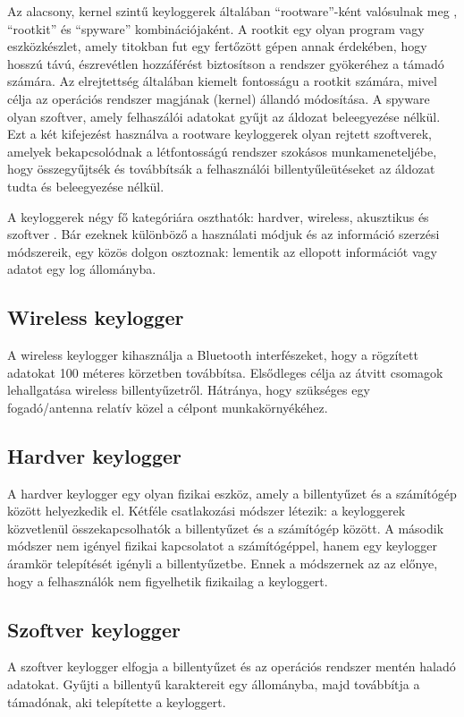 \documentclass[12pt,a4paper,oneside]{report}
\begin{document}
Az alacsony, kernel szintű keyloggerek általában ``rootware''-ként valósulnak meg \cite{butler2006r2}, ``rootkit'' és ``spyware'' kombinációjaként. A rootkit egy olyan program vagy eszközkészlet, amely titokban fut egy fertőzött gépen annak érdekében, hogy hosszú távú, észrevétlen hozzáférést biztosítson a rendszer gyökeréhez a támadó számára. Az elrejtettség általában kiemelt fontosságu a rootkit számára, mivel célja az operációs rendszer magjának (kernel) állandó módosítása. A spyware olyan szoftver, amely felhaszálói adatokat gyűjt az áldozat beleegyezése nélkül. Ezt a két kifejezést használva a rootware keyloggerek olyan rejtett szoftverek, amelyek bekapcsolódnak a létfontosságú rendszer szokásos munkameneteljébe, hogy összegyűjtsék és továbbítsák a felhasználói billentyűleütéseket az áldozat tudta és beleegyezése nélkül.

A keyloggerek négy fő kategóriára oszthatók: hardver, wireless, akusztikus és szoftver \cite{ahmed2014survey}. Bár ezeknek különböző a használati módjuk és az információ szerzési módszereik, egy közös dolgon osztoznak: lementik az ellopott információt vagy adatot egy log állományba.

\subsection{Wireless keylogger}
A wireless keylogger kihasználja a Bluetooth interfészeket, hogy a rögzített adatokat 100 méteres körzetben továbbítsa. Elsődleges célja az átvitt csomagok lehallgatása wireless billentyűzetről. Hátránya, hogy szükséges egy fogadó/antenna relatív közel a célpont munkakörnyékéhez.

\subsection{Hardver keylogger}
A hardver keylogger egy olyan fizikai eszköz, amely a billentyűzet és a számítógép között helyezkedik el. Kétféle csatlakozási módszer létezik: a keyloggerek közvetlenül összekapcsolhatók a billentyűzet és a számítógép között. A második módszer nem igényel fizikai kapcsolatot a számítógéppel, hanem egy keylogger áramkör telepítését igényli a billentyűzetbe. Ennek a módszernek az az előnye, hogy a felhasználók nem figyelhetik fizikailag a keyloggert.

\subsection{Szoftver keylogger}
A szoftver keylogger elfogja a billentyűzet és az operációs rendszer mentén haladó adatokat. Gyűjti a billentyű karaktereit egy állományba, majd továbbítja a támadónak, aki telepítette a keyloggert.
\end{document}
